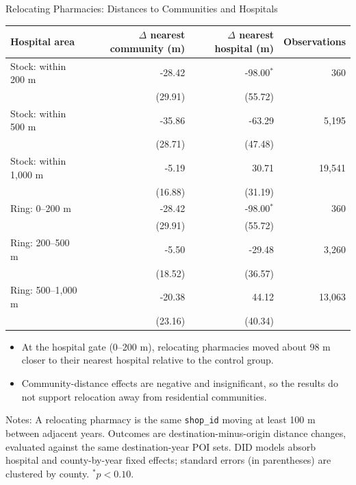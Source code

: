 \documentclass[aspectratio=169,11pt]{beamer}
\renewcommand{\arraystretch}{1.16}
\begin{document}
\begin{frame}{Relocating Pharmacies: Distances to Communities and Hospitals}
\centering
\scriptsize
\begingroup
\renewcommand{\arraystretch}{1.02}
\begin{tabular}{lrrr}
\toprule
Hospital area & $\Delta$ nearest community (m) & $\Delta$ nearest hospital (m) & Observations \\
\midrule
Stock: within 200 m
 & -28.42 & -98.00$^{*}$ & 360 \\
 & (29.91) & (55.72) & \\
Stock: within 500 m
 & -35.86 & -63.29 & 5,195 \\
 & (28.71) & (47.48) & \\
Stock: within 1,000 m
 & -5.19 & 30.71 & 19,541 \\
 & (16.88) & (31.19) & \\
\addlinespace
Ring: 0--200 m
 & -28.42 & -98.00$^{*}$ & 360 \\
 & (29.91) & (55.72) & \\
Ring: 200--500 m
 & -5.50 & -29.48 & 3,260 \\
 & (18.52) & (36.57) & \\
Ring: 500--1,000 m
 & -20.38 & 44.12 & 13,063 \\
 & (23.16) & (40.34) & \\
\bottomrule
\end{tabular}
\endgroup

\vspace{0.2em}
\begin{itemize}\setlength\itemsep{0.2em}
  \item At the hospital gate (0--200 m), relocating pharmacies moved about 98 m closer to their nearest hospital relative to the control group.
  \item Community-distance effects are negative and insignificant, so the results do not support relocation away from residential communities.
\end{itemize}
\vspace{0.05em}
\raggedright\tiny Notes: A relocating pharmacy is the same \texttt{shop\_id} moving at least 100 m between adjacent years. Outcomes are destination-minus-origin distance changes, evaluated against the same destination-year POI sets. DID models absorb hospital and county-by-year fixed effects; standard errors (in parentheses) are clustered by county. $^{*}p<0.10$.
\end{frame}
\end{document}
